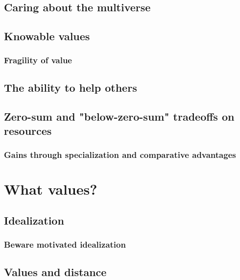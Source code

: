 \documentclass{book}
\begin{document}
\subsection{Caring about the multiverse}
\label{Caring about the multiverse}

\subsection{Knowable values}
\label{Knowable values}

\subsubsection{Fragility of value}
\label{Fragility of value}

\subsection{The ability to help others}
\label{The ability to help others}

\subsection{Zero-sum and "below-zero-sum" tradeoffs on resources}
\label{Zero-sum and "below-zero-sum" tradeoffs on resources}

\subsubsection{Gains through specialization and comparative advantages}
\label{Gains through specialization and comparative advantages}

\section{What values?}
\label{What values?}

\subsection{Idealization}
\label{Idealization}

\subsubsection{Beware motivated idealization}
\label{Beware motivated idealization}

\subsection{Values and distance}
\label{Values and distance}
\end{document}
